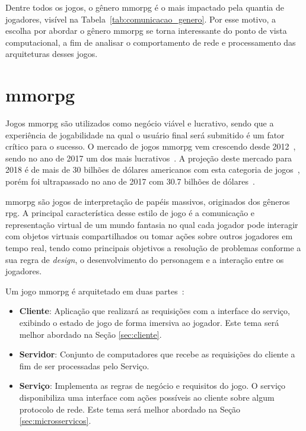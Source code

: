 Dentre todos os jogos, o gênero \ac{mmorpg} é o mais impactado pela quantia de jogadores\cite{mmo_analytic}, visível na Tabela~\ref{tab:comunicacao_genero}.
%
Por esse motivo, a escolha por abordar o gênero \ac{mmorpg} se torna interessante do ponto de vista computacional, a fim de analisar o comportamento de rede e processamento das arquiteturas desses jogos.



\section{\ac{mmorpg}}
\label{sec:mmorpg}



Jogos \ac{mmorpg} são utilizados como negócio viável e lucrativo, sendo que a experiência de jogabilidade na qual o usuário final será submitido é um fator crítico para o sucesso.
%
O mercado de jogos \ac{mmorpg} vem crescendo desde 2012~\cite{new_york_times}, sendo no ano de 2017 um dos mais lucrativos~\cite{statista_2018_mmo}.
%
A projeção deste mercado para 2018 é de mais de 30 bilhões de dólares americanos com esta categoria de jogos~\cite{statista_2018}, porém foi ultrapassado no ano de 2017 com 30.7 bilhões de dólares~\cite{statista_2018_mmo}.



\ac{mmorpg} são jogos de interpretação de papéis massivos, originados dos gêneros \ac{rpg}.
%
A principal característica desse estilo de jogo é a comunicação e representação virtual de um mundo fantasia no qual cada jogador pode interagir com objetos virtuais compartilhados ou tomar ações sobre outros jogadores em tempo real, tendo como principais objetivos a resolução de problemas conforme a sua regra de \textit{design}, o desenvolvimento do personagem e a interação entre os jogadores\cite{video_game_technologies}.



Um jogo \ac{mmorpg} é arquitetado em duas partes~\cite{mmo_analytic}:
\begin{itemize}
  \item \textbf{Cliente}: Aplicação que realizará as requisições com a interface do serviço, exibindo o estado de jogo de forma imersiva ao jogador. Este tema será melhor abordado na Seção \ref{sec:cliente}.
  \item \textbf{Servidor}: Conjunto de computadores que recebe as requisições do cliente a fim de ser processadas pelo Serviço.
  \item \textbf{Serviço}: Implementa as regras de negócio e requisitos do jogo. O serviço disponibiliza uma interface com ações possíveis ao cliente sobre algum protocolo de rede. Este tema será melhor abordado na Seção \ref{sec:microsservicos}.
\end{itemize}


